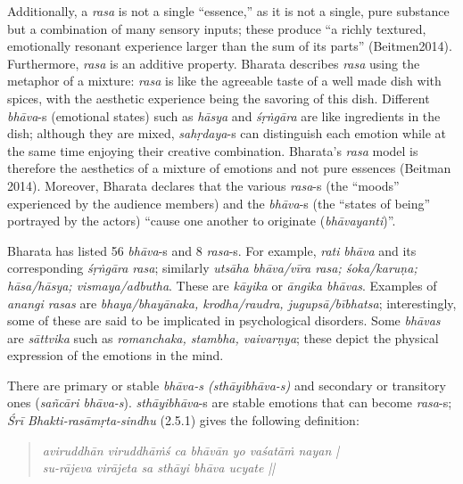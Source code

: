 Additionally, a \textsl{rasa} is not a single “essence,” as it is not a single, pure substance but a combination of many sensory inputs; these produce “a richly textured, emotionally resonant experience larger than the sum of its parts” (Beitmen2014). Furthermore, \textsl{rasa} is an additive property. Bharata describes \textsl{rasa} using the metaphor of a mixture: \textsl{rasa} is like the agreeable taste of a well made dish with spices, with the aesthetic experience being the savoring of this dish. Different \textsl{bhāva}-s (emotional states) such as \textsl{hāsya} and \textsl{śṛṅgāra} are like ingredients in the dish; although they are mixed, \textsl{sahṛdaya}-s can distinguish each emotion while at the same time enjoying their creative combination. Bharata’s \textsl{rasa} model is therefore the aesthetics of a mixture of emotions and not pure essences (Beitman 2014). Moreover, Bharata declares that the various \textsl{rasa}-s (the “moods” experienced by the audience members) and the \textsl{bhāva}-s (the “states of being” portrayed by the actors) “cause one another to originate (\textsl{bhāvayanti})”. 

Bharata has listed 56 \textsl{bhāva}-s and 8 \textsl{rasa}-s. For example, \textsl{rati} \textsl{bhāva} and its corresponding \textsl{śṛṅgāra} \textsl{rasa}; similarly \textsl{utsāha bhāva/vīra rasa; śoka/karuṇa; hāsa/hāsya; vismaya/adbutha}. These are \textsl{kāyika} or \textsl{āngika bhāvas}. Examples of \textsl{anangi rasas} are \textsl{bhaya/bhayānaka, krodha/raudra, jugupsā/bībhatsa}; interestingly, some of these are said to be implicated in psychological disorders. Some \textsl{bhāvas} are \textsl{sāttvika} such as \textsl{romanchaka, stambha, vaivarṇya}; these depict the physical expression of the emotions in the mind.

There are primary or stable \textsl{bhāva-s (sthāyibhāva-s)} and secondary or transitory ones (\textsl{sañcāri bhāva-s}). \textsl{sthāyibhāva}-s are stable emotions that can become \textsl{rasa}-s; \textsl{Śrī Bhakti-rasāmṛta-sindhu} (2.5.1) gives the following definition:
\begin{quote}
\textsl{aviruddhān viruddhāṁś ca bhāvān yo vaśatāṁ nayan |}\\
\textsl{su-rājeva virājeta sa sthāyi bhāva ucyate ||}
\end{quote}

